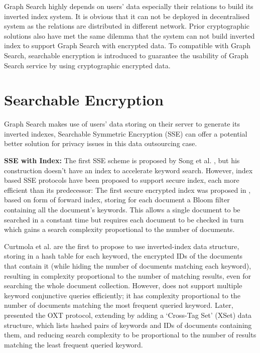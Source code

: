 Graph Search highly depends on users' data especially their relations to build its inverted index system. It is obvious that it can not be deployed in decentralised system as the relations are distributed in different network. Prior cryptographic solutions also have met the same dilemma that the system can not build inverted index to support Graph Search with encrypted data. To compatible with Graph Search, searchable encryption is introduced to guarantee the usability of Graph Search service by using cryptographic encrypted data.

\section{Searchable Encryption}
Graph Search makes use of users' data storing on their server to generate its inverted indexes, Searchable Symmetric Encryption (SSE) can offer a potential better solution for privacy issues in this data outsourcing case. 

{\bf SSE with Index:} The first SSE scheme is proposed by Song et al. \cite{song2000practical}, but his construction doesn't have an index to accelerate keyword search. However, index based SSE protocols have been proposed to support secure index, each more efficient than its predecessor: The first secure encrypted index was proposed in \cite{goh2003secure}, based on form of forward index, storing for each document a Bloom filter containing all the document's keywords. This allows a single document to be searched in a constant time but requires each document to be checked in turn which gains a search complexity proportional to the number of documents.

Curtmola et al. \cite{curtmola2011searchable} are the first to propose to use inverted-index data structure, storing in a hash table for each keyword, the encrypted IDs of the documents that contain it (while hiding the number of documents matching each keyword), resulting in complexity proportional to the number of matching results, even for searching the whole document collection. However, \cite{curtmola2011searchable} does not support multiple keyword conjunctive queries efficiently; it has complexity proportional to the number of documents matching the most frequent queried keyword. Later, \cite{cash2013highly} presented the OXT protocol, extending \cite{curtmola2011searchable} by adding a `Cross-Tag Set' (XSet) data structure, which lists hashed pairs of keywords and IDs of documents containing them, and reducing search complexity to be proportional to the number of results matching the least frequent queried keyword.


